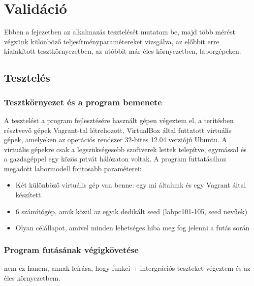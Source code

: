 \chapter{Validáció}
\label{chp:validation}

Ebben a fejezetben az alkalmazás tesztelését mutatom be, majd több mérést végzünk különböző teljesítményparamétereket vizsgálva, az előbbit erre kialakított tesztkörnyezetben, az utóbbit már éles környezetben, laborgépeken.

\section{Tesztelés}

%
\subsection{Tesztkörnyezet és a program bemenete}
%

A tesztelést a program fejlesztésére használt gépen végeztem el, a terítésben résztvevő gépek Vagrant-tal létrehozott, VirtualBox\cite{virtualbox} által futtatott virtuális gépek, amelyeken az operációs rendszer 32-bites 12.04 verziójú Ubuntu\cite{ubuntu}. A virtuális gépekre csak a legszükségesebb szoftverek lettek telepítve, egymással és a gazdagéppel egy közös privát hálózaton voltak. A program futtatásához megadott labormodell fontosabb paraméterei:

\begin{itemize}
  \item Két különböző virtuális gép van benne: egy mi általunk és egy Vagrant által készített
  \item 6 számítógép, amik közül az egyik dedikált seed (labpc101-105, seed nevűek)
  \item Olyan célállapot, amivel minden lehetséges hiba meg fog jelenni a futás során
\end{itemize}

%
\subsection{Program futásának végigkövetése}
%

nem ez hanem, annak leírása, hogy funkci + intergrációs teszteket végeztem és az éles környezetbem.



